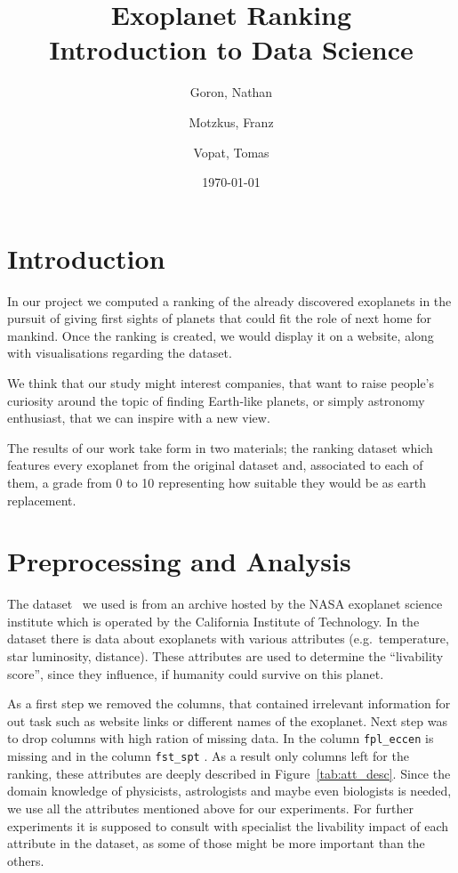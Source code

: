 \documentclass[12p]{article}
\title{Exoplanet Ranking \\\large Introduction to Data Science}
\date{\today}
\author{Goron, Nathan\and Motzkus, Franz\and Vopat, Tomas
}
\begin{document}
\maketitle

\section{Introduction}

In our project we computed a ranking of the already discovered exoplanets in the pursuit of giving first sights of planets that could fit the role of next home for mankind.
Once the ranking is created, we would display it on a website, along with visualisations regarding the dataset.

We think that our study might interest companies, that want to raise people's curiosity around the topic of finding Earth-like planets, or simply astronomy enthusiast, that we can inspire with a new view.

The results of our work take form in two materials; the ranking dataset which features every exoplanet from the original dataset and, associated to each of them, a grade from 0 to 10 representing how suitable they would be as earth replacement.


\section{Preprocessing and Analysis}
The dataset~\cite{dataset} we used is from an archive hosted by the NASA exoplanet science institute which is operated by the California Institute of Technology. In the dataset there is data about  exoplanets with  various attributes (e.g.\ temperature, star luminosity, distance). These attributes are used to determine the ``livability score'', since they influence, if humanity could survive on this planet.

As a first step we removed the columns, that contained irrelevant information for out task such as website links or different names of the exoplanet. Next step was to drop columns with high ration of missing data. In the column \verb|fpl_eccen| is  missing and in the column \verb|fst_spt| . As a result only  columns left for the ranking, these attributes are deeply described in Figure~\ref{tab:att_desc}. Since the domain knowledge of physicists, astrologists and maybe even biologists is needed, we use all the attributes mentioned above for our experiments. For further experiments it is supposed to consult with specialist the livability impact of each attribute in the dataset, as some of those might be more important than the others.
\end{document}
